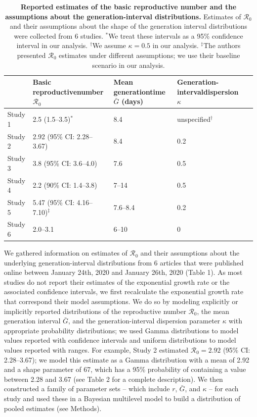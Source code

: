 \documentclass[12pt]{article}
\newcommand{\Rx}[1]{\ensuremath{{\mathcal R}_{#1}}}
\newcommand{\Ro}{\Rx{0}\xspace}
\begin{document}
\begin{table}[t]
\begin{center}
\scriptsize
\begin{tabular}{l|p{3.5cm}|p{2.5cm}|p{2.7cm}|l}
 & Basic reproductive\newline number \Ro\ & Mean generation\newline time $\bar G$ (days) & Generation-interval\newline dispersion $\kappa$ \\
\hline
Study 1 & 2.5 (1.5--3.5)$^\ast$ & 8.4 & unspecified$^\dagger$ & \cite{imaincov} \\
\hline
Study 2 & 2.92 (95\% CI: 2.28--3.67) & 8.4 & 0.2 & \cite{liuncov} \\
\hline
Study 3 & 3.8 (95\% CI: 3.6--4.0) & 7.6 & 0.5 & \cite{readncov} \\
\hline
Study 4 & 2.2 (90\% CI: 1.4--3.8) & 7--14 & 0.5 & \cite{riouncov} \\
\hline
Study 5 & 5.47 (95\% CI: 4.16--7.10)$^\ddagger$ & 7.6--8.4 & 0.2 & \cite{zhaoncov} \\
\hline
Study 6 & 2.0--3.1 & 6--10 & 0 & \cite{majumderncov} \\
\hline
\end{tabular}
\end{center}
\caption{
\textbf{Reported estimates of the basic reproductive number and the assumptions about the generation-interval distributions.}
Estimates of \Ro and their assumptions about the shape of the generation interval distributions were collected from 6 studies.
$^\ast$We treat these intervals as a 95\% confidence interval in our analysis.
$^\dagger$We assume $\kappa = 0.5$ in our analysis.
$^\ddagger$The authors presented \Ro estimates under different assumptions; we use their baseline scenario in our analysis.
}
\end{table}

We gathered information on estimates of \Ro and their assumptions about the underlying generation-interval distributions from 6 articles that were published online between January 24th, 2020 and January 26th, 2020 (Table 1).
As most studies do not report their estimates of the exponential growth rate or the associated confidence intervals, we first recalculate the exponential growth rate that correspond their model assumptions.
We do so by modeling explicitly or implicitly reported distributions of the reproductive number \Ro, the mean generation interval $\bar G$, and the generation-interval dispersion parameter $\kappa$ with appropriate probability distributions;
we used Gamma distributions to model values reported with confidence intervals and uniform distributions to model values reported with ranges.
For example, Study 2 estimated $\Ro = 2.92$ (95\% CI: 2.28--3.67);
we model this estimate as a Gamma distribution with a mean of 2.92 and a shape parameter of 67, which has a 95\% probability of containing a value between 2.28 and 3.67 (see Table 2 for a complete description).
We then constructed a family of parameter sets -- which include $r$, $\bar G$, and $\kappa$ -- for each study and used these in a Bayesian multilevel model to build a distribution of pooled estimates (see Methods).
\end{document}
